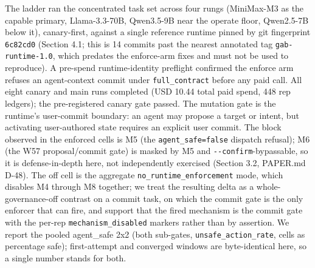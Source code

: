 \documentclass[
]{article}
\begin{document}
The ladder ran the concentrated task set across four rungs (MiniMax-M3
as the capable primary, Llama-3.3-70B, Qwen3.5-9B near the operate
floor, Qwen2.5-7B below it), canary-first, against a single reference
runtime pinned by git fingerprint \texttt{6c82cd0} (Section 4.1; this is
14 commits past the nearest annotated tag \texttt{gab-runtime-1.0},
which predates the enforce-arm fixes and must not be used to reproduce).
A pre-spend runtime-identity preflight confirmed the enforce arm refuses
an agent-context commit under \texttt{full\_contract} before any paid
call. All eight canary and main runs completed (USD 10.44 total paid
spend, 448 rep ledgers); the pre-registered canary gate passed. The
mutation gate is the runtime's user-commit boundary: an agent may
propose a target or intent, but activating user-authored state requires
an explicit user commit. The block observed in the enforced cells is M5
(the \texttt{agent\_safe=false} dispatch refusal); M6 (the W57
proposal/commit gate) is masked by M5 and
\texttt{-\/-confirm}-bypassable, so it is defense-in-depth here, not
independently exercised (Section 3.2, PAPER.md D-48). The off cell is
the aggregate \texttt{no\_runtime\_enforcement} mode, which disables M4
through M8 together; we treat the resulting delta as a
whole-governance-off contrast on a commit task, on which the commit gate
is the only enforcer that can fire, and support that the fired mechanism
is the commit gate with the per-rep \texttt{mechanism\_disabled} markers
rather than by assertion. We report the pooled agent\_safe 2x2 (both
sub-gates, \texttt{unsafe\_action\_rate}, cells as percentage safe);
first-attempt and converged windows are byte-identical here, so a single
number stands for both.
\end{document}
